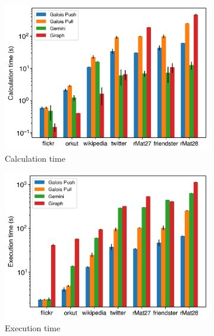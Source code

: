\begin{figure}[h]
	\hfil
	\begin{subfigure}{0.32\textwidth}
		\includegraphics[width=\linewidth]{../../plots/distributedBFS_calcTime.png}
		\caption{Calculation time}
		\label{fig:distributedBFS_calc}
	\end{subfigure}
	\hfil
	\begin{subfigure}{0.32\textwidth}
		\includegraphics[width=\linewidth]{../../plots/distributedBFS_execTime.png}
		\caption{Execution time}
		\label{fig:distributedBFS_exec}
	\end{subfigure}
	\hfil
	\begin{subfigure}{0.32\textwidth}

\end{subfigure}
\end{figure}
